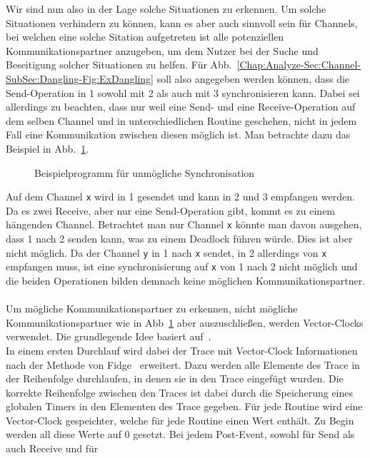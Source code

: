 Wir sind nun also in der Lage solche Situationen zu erkennen. Um solche Situationen verhindern 
zu können, kann es aber auch sinnvoll sein für Channels, bei welchen eine solche Sitation aufgetreten ist 
alle potenziellen Kommunikationspartner anzugeben, um dem Nutzer bei der Suche und Beseitigung 
solcher Situationen zu helfen. Für Abb.~\ref{Chap:Analyze-Sec:Channel-SubSec:Dangling-Fig:ExDangling}
soll also angegeben werden können, dass die Send-Operation in 1 sowohl mit 2 als auch mit 3 
synchronisieren kann. Dabei sei allerdings zu beachten, dass nur weil eine Send- und eine 
Receive-Operation auf dem selben Channel und in unterschiedlichen Routine geschehen, nicht 
in jedem Fall eine Kommunikation zwischen diesen möglich ist. Man betrachte dazu das Beispiel in 
Abb.~\ref{Chap:Analyze-Sec:Channel-SubSec:Dangling-Fig:NoSync}.
\begin{figure}[h!]
  
  \caption{Beispielprogramm für unmögliche Synchronisation}
  \label{Chap:Analyze-Sec:Channel-SubSec:Dangling-Fig:NoSync}
\end{figure}
Auf dem Channel \texttt{x} wird in 1 gesendet und kann in 2 und 3 empfangen werden. Da es zwei Receive, 
aber nur eine Send-Operation gibt, kommt es zu einem hängenden Channel. Betrachtet man nur 
Channel \texttt{x} könnte man davon ausgehen, dass 1 nach 2 senden kann, was zu einem Deadlock
führen würde. Dies ist aber nicht möglich. Da der Channel \texttt{y} in 1 nach \texttt{x} sendet, 
in 2 allerdings von \texttt{x} empfangen muss, ist eine synchronisierung auf \texttt{x} von 1 nach 
2 nicht möglich und die beiden Operationen bilden demnach keine möglichen Kommunikationspartner.\\\\
Um mögliche Kommunikationspartner zu erkennen, nicht mögliche Kommunikationspartner wie in 
Abb~\ref{Chap:Analyze-Sec:Channel-SubSec:Dangling-Fig:NoSync} aber auszuschließen, werden
Vector-Clocks verwendet. Die grundlegende Idee basiert auf~\cite{PPDP18}.\\
In einem ersten Durchlauf wird dabei der Trace mit Vector-Clock Informationen nach der Methode 
von Fidge~\cite{Fidge} erweitert. Dazu werden alle Elemente des Trace in der Reihenfolge durchlaufen, 
in denen sie in den Trace eingefügt wurden. Die korrekte Reihenfolge zwischen den Traces ist dabei 
durch die Speicherung eines globalen Timers in den Elementen des Trace gegeben. Für jede Routine 
wird eine Vector-Clock gespeichter, welche für jede Routine einen Wert enthält. Zu Begin werden 
all diese Werte auf 0 gesetzt. Bei jedem Post-Event, sowohl für Send als auch Receive und für 
